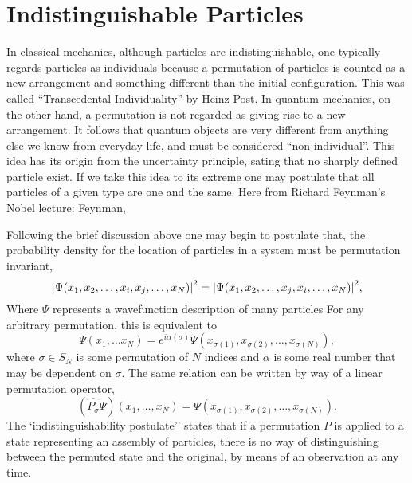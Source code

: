     \section{Indistinguishable Particles}

        In classical mechanics, although particles are indistinguishable, one typically
        regards particles as individuals because a permutation of particles is counted as
        a new arrangement and something different than the initial configuration. 
        This was called ``Transcedental
        Individuality'' by Heinz Post\cite{post1963individuality}. In quantum mechanics, on 
        the other hand, a permutation is not regarded as giving rise to a new 
        arrangement. It follows that quantum objects are very different from anything else we
        know from everyday life, and must be considered ``non-individual''. This 
        idea has its origin from the uncertainty principle, sating that no sharply defined 
        particle exist. If we take this idea
        to its extreme one may postulate that all particles of a given type are one and the
        same. Here from Richard Feynman's Nobel lecture:
        Feynman\cite{feynman1965nobel},

        Following the brief discussion above one may begin to postulate that, the probability density
        for the location of particles in a system must be permutation invariant,
        \begin{equation}
            \label{eq:square_wavefunction_pauli}
            \abs{\Psi(x_1, x_2, \dots, x_i, x_j, \dots, x_N)}^2 
            = 
            \abs{\Psi(x_1, x_2, \dots, x_j, x_i, \dots, x_N)}^2,
        \end{equation}
        Where $\Psi$ represents a wavefunction description of many particles 
        For any arbitrary permutation, this is equivalent to 
        \begin{equation}
            \Psi(x_1, \dots x_N) 
            =
            e^{i\alpha(\sigma)}\Psi(x_{\sigma(1)}, x_{\sigma(2)}, \dots, x_{\sigma(N)}),
        \end{equation}
        where $\sigma \in S_N$ is some permutation of $N$ indices and $\alpha$ is 
        some real number that may be dependent on $\sigma$.
        The same relation can be written by way of a linear permutation operator,
        \begin{equation}
            (\hat{P_\sigma}\Psi)(x_1, \dots, x_N)
            =
            \Psi(x_{\sigma(1)}, x_{\sigma(2)}, \dots, x_{\sigma(N)}).
        \end{equation}
        The `indistinguishability postulate'' states that if a permutation $P$ is applied 
        to a state representing an assembly of particles, there is no way of distinguishing
        between the permuted state and the original, by means of an observation at any time.
   
